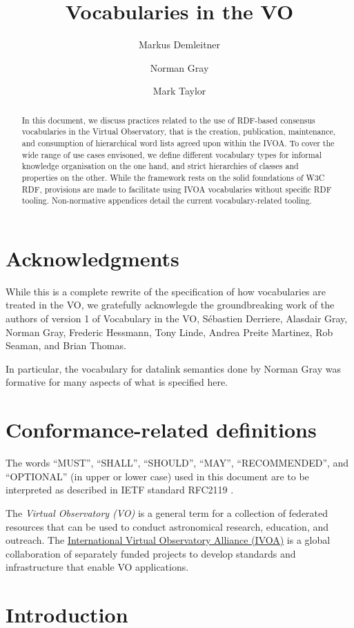 \documentclass[11pt,a4paper]{ivoa}
\title{Vocabularies in the VO}
\author[https://wiki.ivoa.net/twiki/bin/view/IVOA/MarkusDemleitner]{Markus
Demleitner}
\author[https://wiki.ivoa.net/twiki/bin/view/IVOA/NormanGray]{Norman
Gray}
\author[https://wiki.ivoa.net/twiki/bin/view/IVOA/MarkTaylor]{Mark
Taylor}
\begin{document}
\begin{abstract}
In this document, we discuss practices related to the use of RDF-based
consensus vocabularies in the Virtual Observatory, that is the creation,
publication, maintenance, and consumption of 
hierarchical word lists agreed upon within the IVOA.
To cover the wide range of use cases envisoned, we define different
vocabulary types for informal knowledge organisation on the
one hand, and strict hierarchies of classes and properties on the other.
While the framework rests on the solid foundations of W3C RDF,
provisions are made to facilitate using IVOA vocabularies without
specific RDF tooling.
Non-normative appendices detail the current vocabulary-related tooling.
\end{abstract}


\section*{Acknowledgments}

While this is a complete rewrite of the specification of how vocabularies
are treated in the VO, we gratefully acknowlegde the groundbreaking work
of the authors of version 1 of Vocabulary in the VO, S\'ebastien
Derriere, Alasdair Gray, Norman Gray, Frederic Hessmann, Tony Linde,
Andrea Preite Martinez, Rob Seaman, and Brian Thomas.

In particular, the vocabulary for datalink semantics done by Norman Gray
was formative for many aspects of what is specified here.

\section*{Conformance-related definitions}

The words ``MUST'', ``SHALL'', ``SHOULD'', ``MAY'', ``RECOMMENDED'', and
``OPTIONAL'' (in upper or lower case) used in this document are to be
interpreted as described in IETF standard RFC2119 \citep{std:RFC2119}.

The \emph{Virtual Observatory (VO)} is a
general term for a collection of federated resources that can be used
to conduct astronomical research, education, and outreach.
The \href{http://www.ivoa.net}{International
Virtual Observatory Alliance (IVOA)} is a global
collaboration of separately funded projects to develop standards and
infrastructure that enable VO applications.

\section{Introduction}
\end{document}
